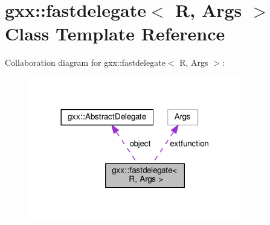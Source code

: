 \hypertarget{classgxx_1_1fastdelegate}{}\section{gxx\+:\+:fastdelegate$<$ R, Args $>$ Class Template Reference}
\label{classgxx_1_1fastdelegate}


Collaboration diagram for gxx\+:\+:fastdelegate$<$ R, Args $>$\+:
\nopagebreak
\begin{figure}[H]
\begin{center}
\leavevmode
\includegraphics[width=264pt]{classgxx_1_1fastdelegate__coll__graph}
\end{center}
\end{figure}

